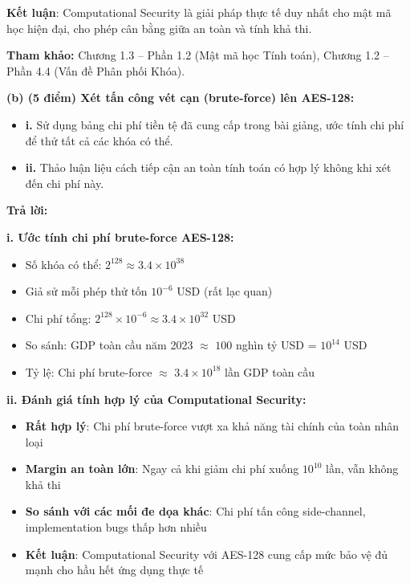 \textbf{Kết luận}: Computational Security là giải pháp thực tế duy nhất cho mật mã học hiện đại, cho phép cân bằng giữa an toàn và tính khả thi.

\textbf{Tham khảo:} Chương 1.3 – Phần 1.2 (Mật mã học Tính toán), Chương 1.2 – Phần 4.4 (Vấn đề Phân phối Khóa).

\textbf{(b) (5 điểm) Xét tấn công vét cạn (brute-force) lên AES-128:}

\begin{itemize}
    \item \textbf{i.} Sử dụng bảng chi phí tiền tệ đã cung cấp trong bài giảng, ước tính chi phí để thử tất cả các khóa có thể.
    \item \textbf{ii.} Thảo luận liệu cách tiếp cận an toàn tính toán có hợp lý không khi xét đến chi phí này.
\end{itemize}

\begin{center}
\textbf{Trả lời:}
\end{center}

\textbf{i. Ước tính chi phí brute-force AES-128:}
\begin{itemize}
    \item Số khóa có thể: $2^{128} \approx 3.4 \times 10^{38}$
    \item Giả sử mỗi phép thử tốn $10^{-6}$ USD (rất lạc quan)
    \item Chi phí tổng: $2^{128} \times 10^{-6} \approx 3.4 \times 10^{32}$ USD
    \item So sánh: GDP toàn cầu năm 2023 $\approx$ $100$ nghìn tỷ USD = $10^{14}$ USD
    \item Tỷ lệ: Chi phí brute-force $\approx$ $3.4 \times 10^{18}$ lần GDP toàn cầu
\end{itemize}

\textbf{ii. Đánh giá tính hợp lý của Computational Security:}
\begin{itemize}
    \item \textbf{Rất hợp lý}: Chi phí brute-force vượt xa khả năng tài chính của toàn nhân loại
    \item \textbf{Margin an toàn lớn}: Ngay cả khi giảm chi phí xuống $10^{10}$ lần, vẫn không khả thi
    \item \textbf{So sánh với các mối đe dọa khác}: Chi phí tấn công side-channel, implementation bugs thấp hơn nhiều
    \item \textbf{Kết luận}: Computational Security với AES-128 cung cấp mức bảo vệ đủ mạnh cho hầu hết ứng dụng thực tế
\end{itemize}

